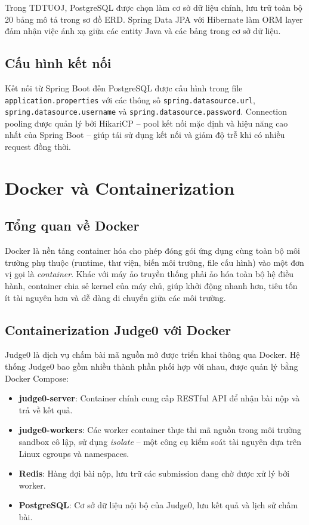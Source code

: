 \documentclass[12pt, a4paper]{report}
\begin{document}
Trong TDTUOJ, PostgreSQL được chọn làm cơ sở dữ liệu chính, lưu trữ toàn bộ 20 bảng mô tả trong sơ đồ \ac{ERD}. Spring Data \ac{JPA} với Hibernate làm ORM layer đảm nhận việc ánh xạ giữa các entity Java và các bảng trong cơ sở dữ liệu.

\subsection{Cấu hình kết nối}

Kết nối từ Spring Boot đến PostgreSQL được cấu hình trong file \texttt{application.pro\-perties} với các thông số \texttt{spring.data\-source.url}, \texttt{spring.data\-source.user\-name} và \texttt{spring.data\-source.pass\-word}. Connection pooling được quản lý bởi HikariCP -- pool kết nối mặc định và hiệu năng cao nhất của Spring Boot -- giúp tái sử dụng kết nối và giảm độ trễ khi có nhiều request đồng thời.

\section{Docker và Containerization}

\subsection{Tổng quan về Docker}

Docker là nền tảng container hóa cho phép đóng gói ứng dụng cùng toàn bộ môi trường phụ thuộc (runtime, thư viện, biến môi trường, file cấu hình) vào một đơn vị gọi là \textit{container}. Khác với máy ảo truyền thống phải ảo hóa toàn bộ hệ điều hành, container chia sẻ kernel của máy chủ, giúp khởi động nhanh hơn, tiêu tốn ít tài nguyên hơn và dễ dàng di chuyển giữa các môi trường.

\subsection{Containerization Judge0 với Docker}

Judge0 là dịch vụ chấm bài mã nguồn mở được triển khai thông qua Docker. Hệ thống Judge0 bao gồm nhiều thành phần phối hợp với nhau, được quản lý bằng Docker Compose:

\begin{itemize}
  \item \textbf{judge0-server}: Container chính cung cấp \ac{REST}ful \ac{API} để nhận bài nộp và trả về kết quả.
  \item \textbf{judge0-workers}: Các worker container thực thi mã nguồn trong môi trường sandbox cô lập, sử dụng \textit{isolate} -- một công cụ kiểm soát tài nguyên dựa trên Linux cgroups và namespaces.
  \item \textbf{Redis}: Hàng đợi bài nộp, lưu trữ các submission đang chờ được xử lý bởi worker.
  \item \textbf{PostgreSQL}: Cơ sở dữ liệu nội bộ của Judge0, lưu kết quả và lịch sử chấm bài.
\end{itemize}
\end{document}
